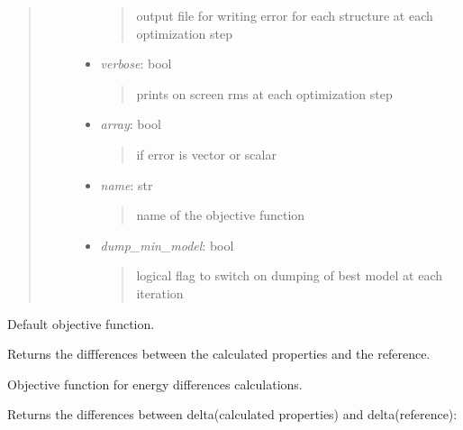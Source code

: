 \documentclass[letterpaper,10pt,english]{sphinxmanual}
\begin{document}
\begin{fulllineitems}
\begin{quote}
\begin{description}
\begin{itemize}
\begin{quote}
output file for writing error for each structure at each 
optimization step
\end{quote}

\item {} 
\emph{verbose}: bool
\begin{quote}

prints on screen rms at each optimization step
\end{quote}

\item {} 
\emph{array}: bool
\begin{quote}

if error is vector or scalar
\end{quote}

\item {} 
\emph{name}: str
\begin{quote}

name of the objective function
\end{quote}

\item {} 
\emph{dump\_min\_model}: bool
\begin{quote}

logical flag to switch on dumping of best model at each iteration
\end{quote}

\end{itemize}

\end{description}\end{quote}

\begin{fulllineitems}
\label{classes:catkernel.CATobjective.default}
Default objective function.

Returns the diffferences between the calculated properties and the
reference.

\end{fulllineitems}


\begin{fulllineitems}
\label{classes:catkernel.CATobjective.difference}
Objective function for energy differences calculations.

Returns the differences between delta(calculated properties) and
delta(reference):


\end{fulllineitems}
\end{fulllineitems}
\end{document}
